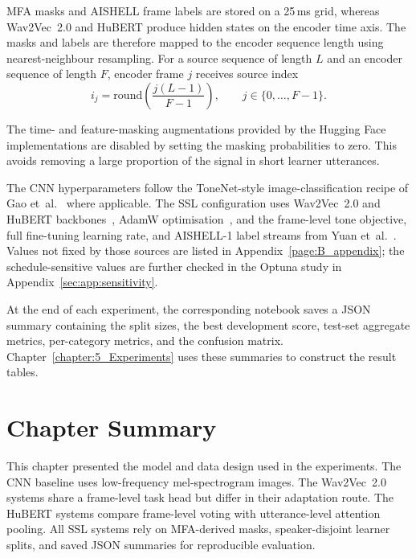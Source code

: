 MFA masks and AISHELL frame labels are stored on a 25\,ms grid, whereas
Wav2Vec~2.0 and HuBERT produce hidden states on the encoder time axis. The masks
and labels are therefore mapped to the encoder sequence length using
nearest-neighbour resampling. For a source sequence of length \(L\) and an
encoder sequence of length \(F\), encoder frame \(j\) receives source index
\begin{equation}
  i_j = \mathrm{round}\!\left(\frac{j(L-1)}{F-1}\right),
  \qquad j \in \{0,\dots,F-1\}.
  \label{eq:design:resample}
\end{equation}

The time- and feature-masking augmentations provided by the Hugging Face
implementations are disabled by setting the masking probabilities to zero. This
avoids removing a large proportion of the signal in short learner utterances.

The CNN hyperparameters follow the ToneNet-style image-classification recipe of
Gao et~al.~\cite{gao2019tonenet} where applicable. The SSL configuration uses
Wav2Vec~2.0 and HuBERT backbones~\cite{baevski2020,hsu2021}, AdamW
optimisation~\cite{loshchilov2019decoupled}, and the frame-level tone objective,
full fine-tuning learning rate, and AISHELL-1 label streams from Yuan
et~al.~\cite{yuan2023}. Values not fixed by those sources are listed in
Appendix~\ref{page:B_appendix}; the schedule-sensitive values are further
checked in the Optuna study in Appendix~\ref{sec:app:sensitivity}.

At the end of each experiment, the corresponding notebook saves a JSON summary
containing the split sizes, the best development score, test-set aggregate
metrics, per-category metrics, and the confusion matrix.
Chapter~\ref{chapter:5_Experiments} uses these summaries to construct the result
tables.



\section{Chapter Summary}
\label{sec:design:summary}

This chapter presented the model and data design used in the experiments. The
CNN baseline uses low-frequency mel-spectrogram images. The Wav2Vec~2.0 systems
share a frame-level task head but differ in their adaptation route. The HuBERT
systems compare frame-level voting with utterance-level attention pooling. All
SSL systems rely on MFA-derived masks, speaker-disjoint learner splits, and
saved JSON summaries for reproducible evaluation.
